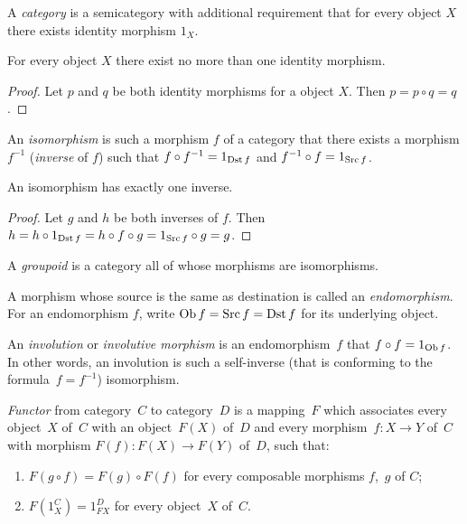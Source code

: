 \begin{defn}
A \emph{category} is a semicategory with additional
requirement that for every object $X$ there exists identity morphism
$1_{X}$.\end{defn}
\begin{prop}
For every object $X$ there exist no more than one identity morphism.\end{prop}
\begin{proof}
Let $p$ and $q$ be both identity morphisms for a object $X$. Then
$p=p\circ q=q$.\end{proof}
\begin{defn}
An \emph{isomorphism} is such
a morphism $f$ of a category that there exists a morphism $f^{-1}$
(\emph{inverse} of $f$) such that $f\circ f^{-1}=1_{\operatorname{Dst} f}$ and
$f^{-1}\circ f=1_{\operatorname{Src} f}$.\end{defn}
\begin{prop}
An isomorphism has exactly one inverse.\end{prop}
\begin{proof}
Let $g$ and $h$ be both inverses of $f$. Then $h=h\circ1_{\operatorname{Dst} f}=h\circ f\circ g=1_{\operatorname{Src} f}\circ g=g$.\end{proof}
\begin{defn}
A \emph{groupoid} is a category all of whose morphisms
are isomorphisms.
\end{defn}

\begin{defn}
A morphism whose source is the same as destination
is called an \emph{endomorphism}. For an endomorphism $f$, write
$\operatorname{Ob} f=\operatorname{Src} f=\operatorname{Dst} f$ for its underlying object.
\end{defn}

\begin{defn}
An \emph{involution}
or \emph{involutive morphism} is an endomorphism~$f$ that $f\circ f=1_{\operatorname{Ob} f}$.
In other words, an involution is such a self-inverse (that is conforming
to the formula~$f=f^{-1}$) isomorphism.
\end{defn}

\begin{defn}
\emph{Functor} from category~$C$ to category~$D$ is a mapping~$F$
which associates every object~$X$ of~$C$ with an object~$F(X)$
of~$D$ and every morphism~$f:X\rightarrow Y$ of~$C$ with morphism
$F(f):F(X)\rightarrow F(Y)$ of~$D$, such that:
\begin{enumerate}
\item $F(g\circ f)=F(g)\circ F(f)$ for every composable morphisms $f$,~$g$
of $C$;
\item $F(1_{X}^{C})=1_{FX}^{D}$ for every object~$X$ of~$C$.
\end{enumerate}
\end{defn}

